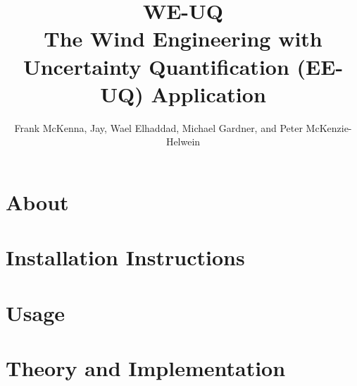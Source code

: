 \documentclass{simcenterdocumentation}
\begin{document}
\title{WE-UQ\\ \Large The Wind Engineering with Uncertainty Quantification (EE-UQ) Application}
\author{Frank McKenna, Jay, Wael Elhaddad, Michael Gardner, and Peter McKenzie-Helwein}

\hypersetup{pageanchor=false}
\maketitle
\copyrightpage
\acknowledgments

\hypersetup{pageanchor=true}
\begin{frontmatter}

\pagestyle{plain}
{
  \renewcommand{\thispagestyle}[1]{}
  \tableofcontents
  \clearpage
  \listoffigures
  \clearpage
  \listoftables
}

\end{frontmatter}
\pagestyle{somewhatsimple}

\chapter{About}
\label{chap:about}


\chapter{Installation Instructions}
\label{chap:installation}



\chapter{Usage}
\label{chap:usage}


\chapter{Theory and Implementation}
\label{chap:theory}

\end{document}
